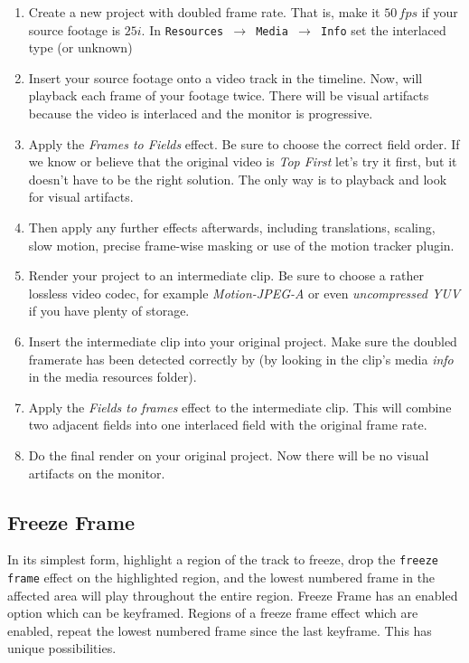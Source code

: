\begin{enumerate}
    \item Create a new project with doubled frame rate. That is, make it $50\,fps$ if your source footage is $25i$.
    In \texttt{Resources $\rightarrow$ Media $\rightarrow$ Info} set the interlaced type (or unknown)
    \item Insert your source footage onto a video track in the timeline. Now, \CGG{} will playback each
    frame of your footage twice. There will be visual artifacts because the video is interlaced and the
    monitor is progressive.
    \item Apply the \textit{Frames to Fields} effect. Be sure to choose the correct field order. If we know or believe that the original video is \textit{Top First} let's try it first, but it doesn't have to be the right solution. The only way is to playback and look for visual artifacts.
    \item Then apply any further effects afterwards, including translations, scaling, slow motion, precise
    frame-wise masking or use of the motion tracker plugin.
    \item Render your project to an intermediate clip. Be sure to choose a rather lossless video codec, for
    example \textit{Motion-JPEG-A} or even \textit{uncompressed YUV} if you have plenty of storage.
    \item Insert the intermediate clip into your original project. Make sure the doubled framerate has been
    detected correctly by \CGG{} (by looking in the clip's media \textit{info} in the media resources folder).
    \item Apply the \textit{Fields to frames} effect to the intermediate clip. This will combine two adjacent fields
    into one interlaced field with the original frame rate.
    \item Do the final render on your original project. Now there will be no visual artifacts on the monitor.
\end{enumerate}

\subsection{Freeze Frame}%
\label{sub:freeze_frame}

In its simplest form, highlight a region of the track to freeze, drop the \texttt{freeze frame} effect on the highlighted region, and the lowest numbered frame in the affected area will play throughout the entire region. Freeze Frame has an enabled option which can be keyframed. Regions of a freeze frame effect which are enabled, repeat the lowest numbered frame since the last keyframe. This has unique possibilities.

